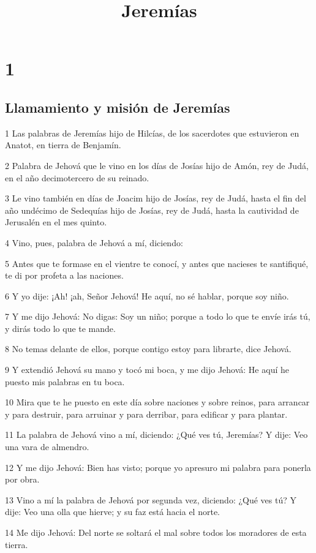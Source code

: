 

\title{Jeremías}

\chapter{1}

\section*{Llamamiento y misión de Jeremías}

\par 1 Las palabras de Jeremías hijo de Hilcías, de los sacerdotes que estuvieron en Anatot, en tierra de Benjamín.
\par 2 Palabra de Jehová que le vino en los días de Josías hijo de Amón, rey de Judá, en el año decimotercero de su reinado.
\par 3 Le vino también en días de Joacim hijo de Josías, rey de Judá, hasta el fin del año undécimo de Sedequías hijo de Josías, rey de Judá, hasta la cautividad de Jerusalén en el mes quinto.
\par 4 Vino, pues, palabra de Jehová a mí, diciendo:
\par 5 Antes que te formase en el vientre te conocí, y antes que nacieses te santifiqué, te di por profeta a las naciones.
\par 6 Y yo dije: ¡Ah! ¡ah, Señor Jehová! He aquí, no sé hablar, porque soy niño.
\par 7 Y me dijo Jehová: No digas: Soy un niño; porque a todo lo que te envíe irás tú, y dirás todo lo que te mande.
\par 8 No temas delante de ellos, porque contigo estoy para librarte, dice Jehová.
\par 9 Y extendió Jehová su mano y tocó mi boca, y me dijo Jehová: He aquí he puesto mis palabras en tu boca.
\par 10 Mira que te he puesto en este día sobre naciones y sobre reinos, para arrancar y para destruir, para arruinar y para derribar, para edificar y para plantar.
\par 11 La palabra de Jehová vino a mí, diciendo: ¿Qué ves tú, Jeremías? Y dije: Veo una vara de almendro.
\par 12 Y me dijo Jehová: Bien has visto; porque yo apresuro mi palabra para ponerla por obra.
\par 13 Vino a mí la palabra de Jehová por segunda vez, diciendo: ¿Qué ves tú? Y dije: Veo una olla que hierve; y su faz está hacia el norte.
\par 14 Me dijo Jehová: Del norte se soltará el mal sobre todos los moradores de esta tierra.
